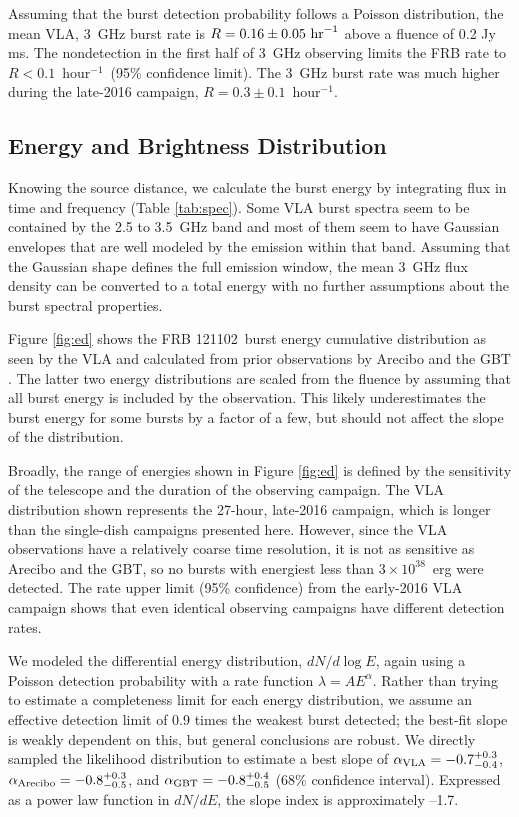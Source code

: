 \documentclass[twocolumn]{aastex61}
\newcommand{\frb}{FRB 121102}
\begin{document}
Assuming that the burst detection probability follows a Poisson distribution, the mean VLA, 3~GHz burst rate is $R=0.16\pm0.05\ \rm{hr}^{-1}$ above a fluence of 0.2 Jy ms. The nondetection in the first half of 3~GHz observing limits the FRB rate to $R<0.1$\ hour$^{-1}$\ (95\% confidence limit). The 3~GHz burst rate was much higher during the late-2016 campaign, $R=0.3\pm0.1$\ hour$^{-1}$.

\subsection{Energy and Brightness Distribution}
\label{sec:disn}

Knowing the source distance, we calculate the burst energy by integrating flux in time and frequency (Table \ref{tab:spec}). Some VLA burst spectra seem to be contained by the 2.5 to 3.5~GHz band and most of them seem to have Gaussian envelopes that are well modeled by the emission within that band. Assuming that the Gaussian shape defines the full emission window, the mean 3~GHz flux density can be converted to a total energy with no further assumptions about the burst spectral properties.

Figure \ref{fig:ed} shows the \frb\ burst energy cumulative distribution as seen by the VLA and calculated from prior observations by Arecibo and the GBT \citep{2016Natur.531..202S,2016arXiv160308880S}. The latter two energy distributions are scaled from the fluence by assuming that all burst energy is included by the observation. This likely underestimates the burst energy for some bursts by a factor of a few, but should not affect the slope of the distribution.

Broadly, the range of energies shown in Figure \ref{fig:ed} is defined by the sensitivity of the telescope and the duration of the observing campaign. The VLA distribution shown represents the 27-hour, late-2016 campaign, which is longer than the single-dish campaigns presented here. However, since the VLA observations have a relatively coarse time resolution, it is not as sensitive as Arecibo and the GBT, so no bursts with energiest less than $3\times10^{38}$~erg were detected. The rate upper limit (95\% confidence) from the early-2016 VLA campaign shows that even identical observing campaigns have different detection rates.

We modeled the differential energy distribution, $dN/d\log{E}$, again using a Poisson detection probability with a rate function $\lambda = A E^{\alpha}$. Rather than trying to estimate a completeness limit for each energy distribution, we assume an effective detection limit of 0.9 times the weakest burst detected; the best-fit slope is weakly dependent on this, but general conclusions are robust. We directly sampled the likelihood distribution to estimate a best slope of $\alpha_{\rm{VLA}}=-0.7^{+0.3}_{-0.4}$, $\alpha_{\rm{Arecibo}}=-0.8^{+0.3}_{-0.5}$, and $\alpha_{\rm{GBT}}=-0.8^{+0.4}_{-0.5}$ (68\% confidence interval). Expressed as a power law function in $dN/dE$, the slope index is approximately --1.7. 
\end{document}
